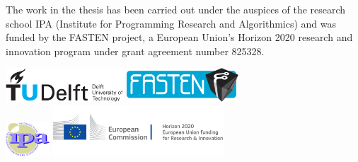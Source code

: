 \begin{titlepage}
\begin{tabular}{p{4.5cm}l}

\end{tabular}


\medskip
\medskip
\noindent The work in the thesis has been carried out under the auspices of the research school IPA (Institute for Programming Research and Algorithmics) and was funded by the FASTEN project, a European Union’s Horizon 2020 research and innovation program under grant agreement number 825328.

\medskip
\vfill
\begin{center}
    \includegraphics[height=0.5in]{title/logos/tudelft}
    \hspace{2em}
    \includegraphics[height=0.5in]{title/logos/fasten_logo.png}
    \\ \vspace{0.5cm}
    \includegraphics[height=0.5in]{title/logos/ipa}
    \hspace{2em}
    \includegraphics[height=0.75in]{title/logos/eu_h2020_logo.png}
\end{center}
\vfill


\end{titlepage}
